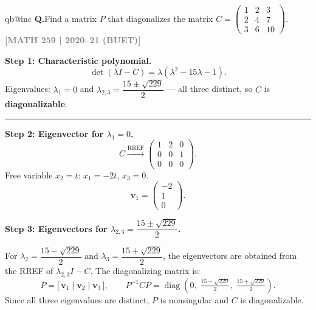 \documentclass[12pt,a3paper]{article}
\makeatletter
\newcommand{\yr}[1]{\hfill\textcolor{gray}{\small\textbf{[#1]}}}
\newcounter{qnum}
\newcommand{\Q}[1]{%
  \csname qb@inc\endcsname
  \needspace{4\baselineskip}
  \refstepcounter{qnum}
  \vspace{6pt}
  \noindent\textbf{Q\theqnum.}\enspace #1\par
}
\makeatother
\begin{document}
\Q{Find a matrix $P$ that diagonalizes the matrix $C = \begin{pmatrix} 1 & 2 & 3 \\ 2 & 4 & 7 \\ 3 & 6 & 10 \end{pmatrix}$.
\yr{MATH 259 | 2020--21 (BUET)}}


\begin{tcolorbox}[enhanced,breakable,
  colback=cE!4,colframe=cE,boxrule=0.8pt,arc=5pt,
  title={\textbf{Answer --- Diagonalizing
    $C=\begin{pmatrix}1&2&3\\2&4&7\\3&6&10\end{pmatrix}$}},
  fonttitle=\bfseries\color{white},colbacktitle=cE]

\textbf{Step 1: Characteristic polynomial.}
\[
  \det(\lambda I-C) = \lambda(\lambda^2-15\lambda-1).
\]
Eigenvalues: $\lambda_1=0$ and $\lambda_{2,3}=\dfrac{15\pm\sqrt{229}}{2}$ — all three distinct,
so $C$ is \textbf{diagonalizable}.

\medskip\textcolor{cE}{\rule{\textwidth}{0.4pt}}

\textbf{Step 2: Eigenvector for $\lambda_1=0$.}
\[
  C\xrightarrow{\text{RREF}}
  \begin{pmatrix}1&2&0\\0&0&1\\0&0&0\end{pmatrix}.
\]
Free variable $x_2=t$: $x_1=-2t$, $x_3=0$.
\[
  \mathbf{v}_1=\begin{pmatrix}-2\\1\\0\end{pmatrix}.
\]

\textbf{Step 3: Eigenvectors for $\lambda_{2,3}=\dfrac{15\pm\sqrt{229}}{2}$.}

For $\lambda_2 = \dfrac{15-\sqrt{229}}{2}$ and $\lambda_3 = \dfrac{15+\sqrt{229}}{2}$,
the eigenvectors are obtained from the RREF of $\lambda_{2,3}I - C$.
The diagonalizing matrix is:
\[
  P = \bigl[\,\mathbf{v}_1\;\big|\;\mathbf{v}_2\;\big|\;\mathbf{v}_3\,\bigr], \qquad
  P^{-1}CP = \operatorname{diag}\!\left(0,\;\tfrac{15-\sqrt{229}}{2},\;\tfrac{15+\sqrt{229}}{2}\right).
\]
Since all three eigenvalues are distinct, $P$ is nonsingular and $C$ is
diagonalizable. \checkmark

\end{tcolorbox}
\end{document}
